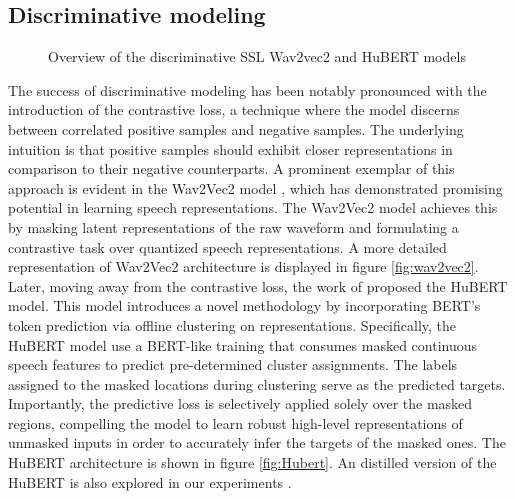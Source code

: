 \subsection{Discriminative modeling}
\begin{figure}[t]
    \centering
    \caption{Overview of the discriminative SSL Wav2vec2 and HuBERT models}
\end{figure}
The success of discriminative modeling has been notably pronounced with the introduction of the contrastive loss, a technique where the model discerns between correlated positive samples and negative samples. The underlying intuition is that positive samples should exhibit closer representations in comparison to their negative counterparts. A prominent exemplar of this approach is evident in the Wav2Vec2 model \cite{baevski2020wav2vec}, which has demonstrated promising potential in learning speech representations. The Wav2Vec2 model achieves this by masking latent representations of the raw waveform and formulating a contrastive task over quantized speech representations. A more detailed representation of Wav2Vec2 architecture is displayed in figure \ref{fig:wav2vec2}. Later, moving away from the contrastive loss, the work of \cite{hsu2021hubert} proposed the HuBERT model. This model introduces a novel methodology by incorporating BERT's token prediction via offline clustering on representations. Specifically, the HuBERT model use a BERT-like training that consumes masked continuous speech features to predict pre-determined cluster assignments. The labels assigned to the masked locations during clustering serve as the predicted targets. Importantly, the predictive loss is selectively applied solely over the masked regions, compelling the model to learn robust high-level representations of unmasked inputs in order to accurately infer the targets of the masked ones. The HuBERT architecture is shown in figure \ref{fig:Hubert}. An distilled version of the HuBERT is also explored in our experiments \cite{chang2022distilhubert}.
